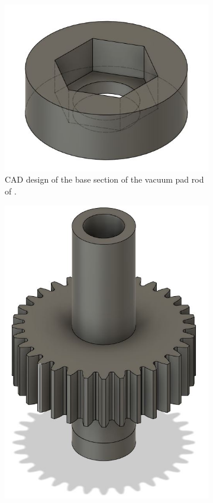\begin{figure}[H]
    \centering
    \begin{subfigure}[b]{0.45\textwidth}
        \includegraphics[width=\textwidth]{figures/202106/vacuum-pad-rod-base.JPG}
        \caption{\ac{CAD} design of the base section of the vacuum pad rod of .}
        \label{fig:vacuum-pad-rod-base-cad}
    \end{subfigure}
    \begin{subfigure}[b]{0.45\textwidth}
        \includegraphics[width=\textwidth]{figures/202106/vacuum-pad-rod.JPG}

\end{subfigure}
\end{figure}
